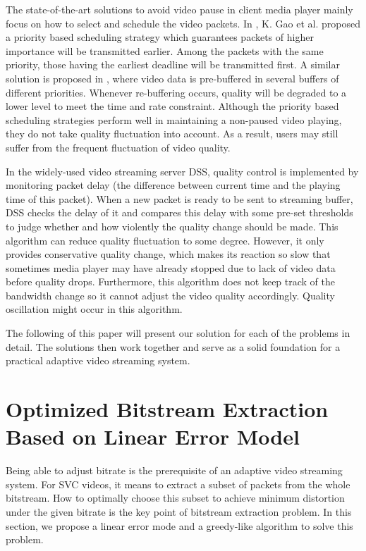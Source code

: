 \documentclass[journal]{IEEEtran}
\begin{document}
The state-of-the-art solutions to avoid video pause in client media player mainly focus on how to select and schedule the video packets. In \cite{Gao06}, K. Gao et al. proposed a priority based scheduling strategy which guarantees packets of higher importance will be transmitted earlier. Among the packets with the same priority, those having the earliest deadline will be transmitted first. A similar solution is proposed in \cite{Schierl10}, where video data is pre-buffered in several buffers of different priorities. Whenever re-buffering occurs, quality will be degraded to a lower level to meet the time and rate constraint. Although the priority based scheduling strategies perform well in maintaining a non-paused video playing, they do not take quality fluctuation into account. As a result, users may still suffer from the frequent fluctuation of video quality.

In the widely-used video streaming server DSS, quality control is implemented by monitoring packet delay (the difference between current time and the playing time of this packet). When a new packet is ready to be sent to streaming buffer, DSS checks the delay of it and compares this delay with some pre-set thresholds to judge whether and how violently the quality change should be made. This algorithm can reduce quality fluctuation to some degree. However, it only provides conservative quality change, which makes its reaction so slow that sometimes media player may have already stopped due to lack of video data before quality drops. Furthermore, this algorithm does not keep track of the bandwidth change so it cannot adjust the video quality accordingly. Quality oscillation might occur in this algorithm.

The following of this paper will present our solution for each of the problems in detail. The solutions then work together and serve as a solid foundation for a practical adaptive video streaming system.


\section{Optimized Bitstream Extraction Based on Linear Error Model}
\label{sec:bitstream-extraction}

Being able to adjust bitrate is the prerequisite of an adaptive video streaming system. For SVC videos, it means to extract a subset of packets from the whole bitstream. How to optimally choose this subset to achieve minimum distortion under the given bitrate is the key point of bitstream extraction problem. In this section, we propose a linear error mode and a greedy-like algorithm to solve this problem.
\end{document}
